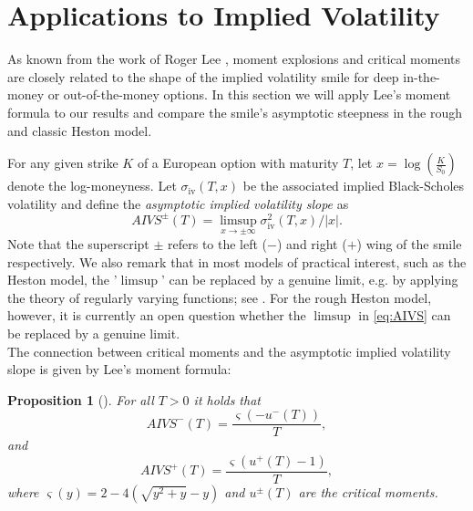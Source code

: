 \documentclass[12pt,a4paper]{amsart}
\numberwithin{equation}{section}
\numberwithin{equation}{section}
\newtheorem{proposition}[theorem]{Proposition}
\theoremstyle{nonumberplain}
\begin{document}
	
	
	\section{Applications to Implied Volatility}\label{sec:implied}
	As known from the work of Roger Lee \cite{lee2004moment}, moment explosions and critical moments are closely related to the shape of the implied volatility smile for deep in-the-money or out-of-the-money options. In this section we will apply Lee's moment formula to our results and compare the smile's asymptotic steepness in the rough and classic Heston model.	
		
	For any given strike $K$ of a European option with maturity $T$, let $x = \log\left(\frac{K}{S_0}\right)$ denote the log-moneyness. Let $\sigma_{\text{iv}}(T,x)$ be the associated implied Black-Scholes volatility and define the \textit{asymptotic implied volatility slope} as 
	\begin{equation}\label{eq:AIVS}
	AIVS^{\pm}(T) = \limsup_{x \to \pm \infty} \sigma_{\text{iv}}^2(T,x)/|x|.
	\end{equation}
	Note that the superscript $\pm$ refers to the left ($-$) and right ($+$) wing of the smile respectively. We also remark that in most models of practical interest, such as the Heston model, the '$\limsup$' can be replaced by a genuine limit, e.g. by applying the theory of regularly varying functions; see \cite{benaim2009regular}. For the rough Heston model, however, it is currently an open question whether the $\limsup$ in \eqref{eq:AIVS} can be replaced by a genuine limit.\\
	The connection between critical moments and the asymptotic implied volatility slope is given by Lee's moment formula:
			
	\begin{proposition}[\cite{lee2004moment}] \label{prop:Lee}
	For all $T > 0$ it holds that
	\begin{equation*}
		AIVS^{-}(T) = \frac{\varsigma( - u^-(T) )}{T},
	\end{equation*}
	and
	\begin{equation*}
		AIVS^{+}(T) = \frac{\varsigma(  u^+(T)-1 )}{T},
	\end{equation*}
	where $ \varsigma(y) = 2 - 4(\sqrt{y^2+y} - y) $ and $u^{\pm}(T)$ are the critical moments.
\end{proposition}
\end{document}
